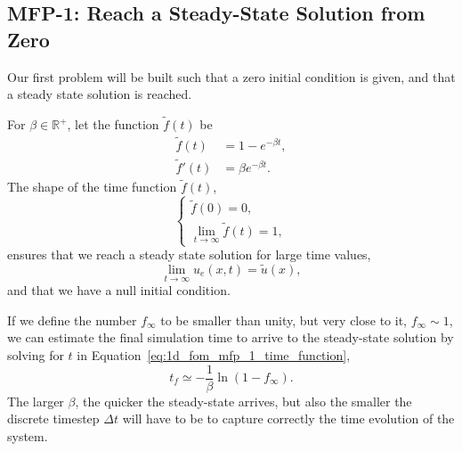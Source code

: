 \documentclass[../main.tex]{subfiles}
\begin{document}

\subsection{MFP-1: Reach a Steady-State Solution from Zero}
Our first problem will be built such that a zero initial condition is given, and that a steady state solution is reached. 

For $\beta \in \mathbb{R}^{+}$, let the function $\tilde{f}(t)$ be
\begin{subequations}
    \begin{align}
        \tilde{f}(t) &= 1 - e^{-\beta t}, \label{eq:1d_fom_mfp_1_time_function}\\
        \tilde{f}'(t) &= \beta e^{-\beta t}.
    \end{align}
\end{subequations}
The shape of the time function $\tilde{f}(t)$,
\begin{equation*}
    \begin{cases}
    \tilde{f}(0) = 0, \\ 
    \lim_{t \rightarrow \infty} \tilde{f}(t) = 1,
    \end{cases}
\end{equation*}
ensures that we reach a steady state solution for large time values,
\begin{equation}
    \lim_{t\rightarrow \infty} u_e(x,t) = \tilde{u}(x),
\end{equation}
and that we have a null initial condition.

If we define the number $f_\infty$ to be smaller than unity, but very close to it, $f_\infty \sim 1$, we can estimate the final simulation time to arrive to the steady-state solution by solving for $t$ in Equation~\eqref{eq:1d_fom_mfp_1_time_function},
\begin{equation}
    t_f \simeq - \frac{1}{\beta} \ln(1 - f_\infty).
\end{equation}
The larger $\beta$, the quicker the steady-state arrives, but also the smaller the discrete timestep $\Delta t$ will have to be to capture correctly the time evolution of the system.
\end{document}
